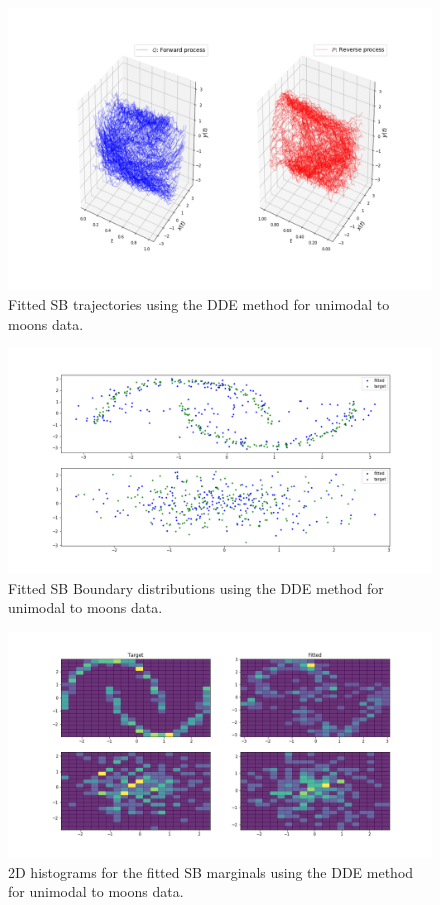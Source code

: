 \documentclass[a4paper,12pt,twoside,openright]{report}
\theoremstyle{definition}
\begin{document}
\begin{figure}
    \centering
    \includegraphics[scale=0.4,trim={5.3cm 1cm 2.5cm 0}, clip]{images/GP/moons_2d_gp_trajectories_short_200.png}
    \caption{ Fitted SB trajectories using the DDE method for unimodal to moons data.  }
    \label{fig:moon2d200trajectroies2d}
\end{figure}
\begin{figure}
    \centering
    \includegraphics[scale=0.4,trim={2.3cm 1cm 2.5cm 0}, clip]{images/GP/gp_moons_scatter_200_big_.png}
    \caption{ Fitted SB Boundary distributions using the DDE method for unimodal to moons data.}
    \label{fig:moon2d200scatter2d}
\end{figure}
\begin{figure}
    \centering
    \includegraphics[scale=0.4,trim={2.3cm 1cm 2.5cm 0}, clip]{images/GP/moons_2d_gp_hist_short_200.png}
    \caption{2D histograms for the fitted SB marginals using the DDE method for unimodal to moons data.}
    \label{fig:moon2d20hist2d}
\end{figure}
\end{document}
